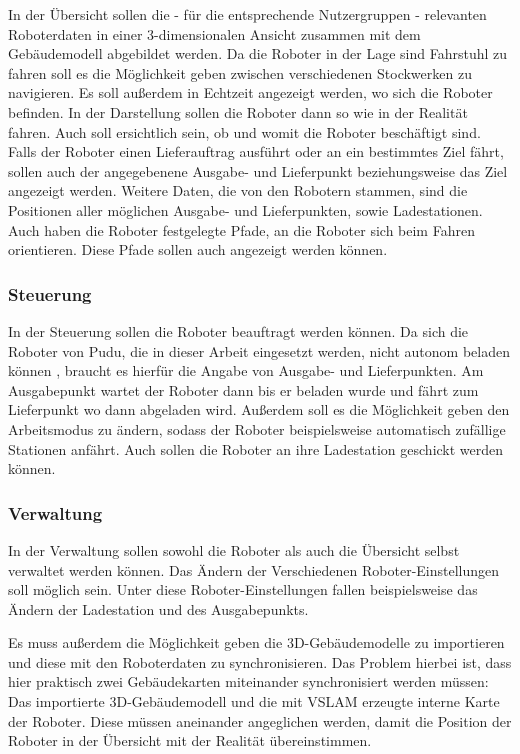 In der Übersicht sollen die - für die entsprechende Nutzergruppen - relevanten Roboterdaten in einer 3-dimensionalen Ansicht zusammen mit dem Gebäudemodell abgebildet werden. Da die Roboter in der Lage sind Fahrstuhl zu fahren soll es die Möglichkeit geben zwischen verschiedenen Stockwerken zu navigieren. Es soll außerdem in Echtzeit angezeigt werden, wo sich die Roboter befinden. In der Darstellung sollen die Roboter dann so wie in der Realität fahren. Auch soll ersichtlich sein, ob und womit die Roboter beschäftigt sind. Falls der Roboter einen Lieferauftrag ausführt oder an ein bestimmtes Ziel fährt, sollen auch der angegebenene Ausgabe- und Lieferpunkt beziehungsweise das Ziel angezeigt werden. Weitere Daten, die von den Robotern stammen, sind die Positionen aller möglichen Ausgabe- und Lieferpunkten, sowie Ladestationen. Auch haben die Roboter festgelegte Pfade, an die Roboter sich beim Fahren orientieren. Diese Pfade sollen auch angezeigt werden können.

\subsubsection{Steuerung}

In der Steuerung sollen die Roboter beauftragt werden können. Da sich die Roboter von Pudu, die in dieser Arbeit eingesetzt werden, nicht autonom beladen können \cite{KettyBot2024}, braucht es hierfür die Angabe von Ausgabe- und Lieferpunkten. Am Ausgabepunkt wartet der Roboter dann bis er beladen wurde und fährt zum Lieferpunkt wo dann abgeladen wird. Außerdem soll es die Möglichkeit geben den Arbeitsmodus zu ändern, sodass der Roboter beispielsweise automatisch zufällige Stationen anfährt. Auch sollen die Roboter an ihre Ladestation geschickt werden können.

\subsubsection{Verwaltung}

In der Verwaltung sollen sowohl die Roboter als auch die Übersicht selbst verwaltet werden können. Das Ändern der Verschiedenen Roboter-Einstellungen soll möglich sein. Unter diese Roboter-Einstellungen fallen beispielsweise das Ändern der Ladestation und des Ausgabepunkts.

Es muss außerdem die Möglichkeit geben die 3D-Gebäudemodelle zu importieren und diese mit den Roboterdaten zu synchronisieren. Das Problem hierbei ist, dass hier praktisch zwei Gebäudekarten miteinander synchronisiert werden müssen: Das importierte 3D-Gebäudemodell und die mit \ac{VSLAM} erzeugte interne Karte der Roboter. Diese müssen aneinander angeglichen werden, damit die Position der Roboter in der Übersicht mit der Realität übereinstimmen.

